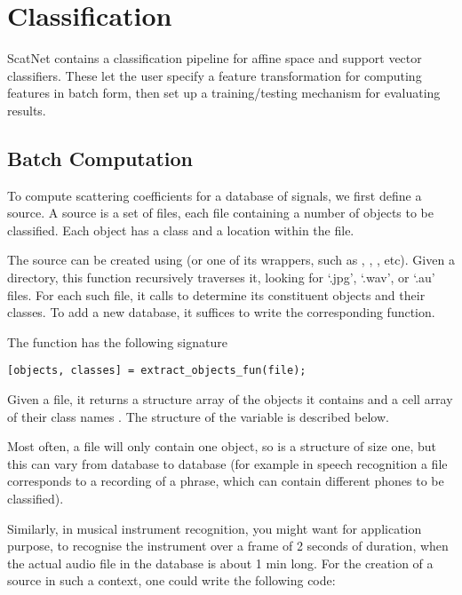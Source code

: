 \documentclass{article}
\begin{document}
\section{Classification \label{sec:classification}}

ScatNet contains a classification pipeline for affine space and support vector classifiers. These let the user specify a feature transformation for computing features in batch form, then set up a training/testing mechanism for evaluating results.

\subsection{Batch Computation \label{sec:batch-computation}}

To compute scattering coefficients for a database of signals, we first define a source. A source is a set of files, each file containing a number of objects to be classified. Each object has a class and a location within the file.

The source can be created using  (or one of its wrappers, such as , , , etc). Given a directory, this function recursively traverses it, looking for `.jpg', `.wav', or `.au' files. For each such file, it calls  to determine its constituent objects and their classes. To add a new database, it suffices to write the corresponding  function.

The  function has the following signature
\begin{lstlisting}
[objects, classes] = extract_objects_fun(file);
\end{lstlisting}
Given a file, it returns a structure array  of the objects it contains and a cell array of their class names . The structure of the  variable is described below.

Most often, a file will only contain one object, so  is a  structure of size one, but this can vary from database to database (for example in speech recognition a file corresponds to a recording of a phrase, which can contain different phones to be classified).

Similarly, in musical instrument recognition, you might want for application purpose, to recognise the instrument over a
frame of 2 seconds of duration, when the actual audio file in the database is about 1 min long.  For the creation
of a source in such a context, one could write the following code:
\end{document}
